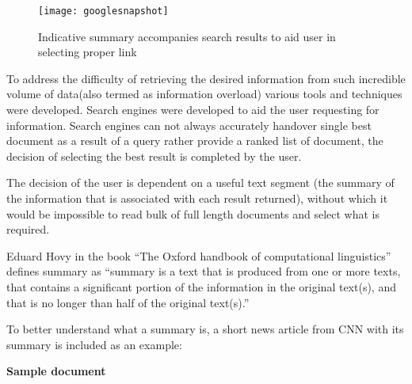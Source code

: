 \begin{figure}[h]
 
\texttt{[image: googlesnapshot]}
 \caption{\singlespace Indicative summary accompanies search results to aid 
user in selecting proper link}
\end{figure}
To address the difficulty of retrieving the desired information from such 
incredible volume of data(also termed as information overload) various tools 
and techniques were
developed. Search engines were developed to aid the user requesting for 
information. Search engines can not always accurately handover single best 
document as a result of 
a query rather provide a ranked list of document, the decision of selecting the 
best result is completed by the user.

The decision of the user is dependent on a useful text segment (the summary of 
the information that is associated with each result returned), without which 
it would be impossible to read bulk of full length documents and select what is 
required. 


Eduard Hovy in the book ``The Oxford handbook of computational linguistics'' 
defines summary as ``summary is a text that is produced from one or more texts, 
that contains a signiﬁcant portion of the information in the original text(s),
and that is no longer than half of the original text(s).''

To better understand what a summary is, a short news article from CNN with its 
summary is included as an example:

\textbf{Sample document}

